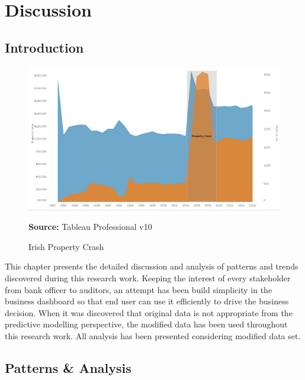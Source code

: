 %
%
%
%

\chapter{Discussion}\label{C.Discussion}
\section{Introduction}\label{S.Discussion.intro}
\begin{center}
\begin{figure}[!htb]
\includegraphics[scale=0.3]{crash1.png}
\centering
\caption{Irish Property Crash}{\textbf{Source:} Tableau Professional v10}
\label{fig:crash1}
\end{figure}
\end{center}
This chapter presents the detailed discussion and analysis of patterns and trends discovered during this research work. Keeping the interest of every stakeholder from bank officer to auditors, an attempt has been build simplicity in the business dashboard so that end user can use it efficiently to drive the business decision. When it was discovered that original data is not appropriate from the predictive modelling perspective, the modified data has been used throughout this research work. All analysis has been presented considering modified data set.

\section{Patterns \&  Analysis}

